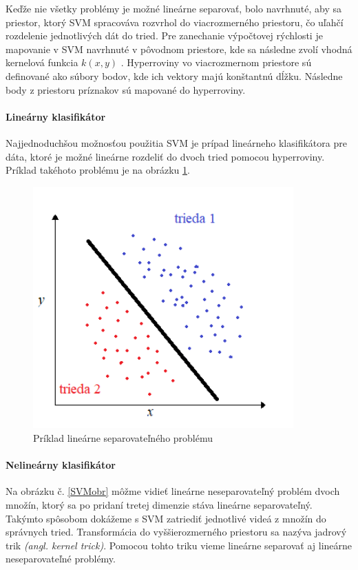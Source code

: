 Keďže nie všetky problémy je možné lineárne separovať, bolo navrhnuté, aby sa priestor, ktorý SVM spracováva rozvrhol do viacrozmerného priestoru, čo uľahčí rozdelenie jednotlivých dát do tried. Pre zanechanie výpočtovej rýchlosti je mapovanie v SVM navrhnuté v pôvodnom priestore, kde sa následne zvolí vhodná kernelová funkcia $ k(x,y)$ . 
Hyperroviny vo viacrozmernom priestore sú definované ako súbory bodov, kde ich vektory majú konštantnú dĺžku. Následne body z priestoru príznakov sú mapované do hyperroviny. 

\paragraph{Lineárny klasifikátor}
Najjednoduchšou možnosťou použitia SVM je prípad lineárneho klasifikátora pre dáta, ktoré je možné lineárne rozdeliť do dvoch tried pomocou hyperroviny. Príklad takéhoto problému je na obrázku \ref{LinSep}.

\begin{figure}[H]
  \centering
  \includegraphics[width=10cm]{img/linsep.png}
  \caption{Príklad lineárne separovateľného problému}
  \label{LinSep}
\end{figure}


\paragraph{Nelineárny klasifikátor}
Na obrázku č. \ref{SVMobr} môžme vidieť lineárne neseparovateľný problém dvoch množín, ktorý sa po pridaní tretej dimenzie stáva lineárne separovateľný. Takýmto spôsobom dokážeme s SVM zatriediť jednotlivé videá z množín do správnych tried. Transformácia do vyššierozmerného priestoru sa nazýva jadrový trik \textit{(angl. kernel trick)}. Pomocou tohto triku vieme lineárne separovať aj lineárne neseparovateľné problémy.\cite{c12}

